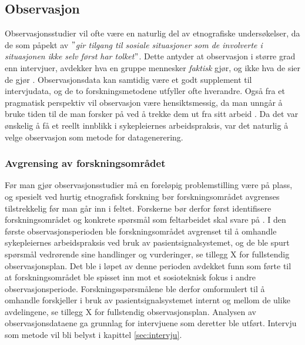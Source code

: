 \subsection{Observasjon}
\label{section:observasjon}
 
Observasjonsstudier vil ofte være en naturlig del av etnografiske undersøkelser, da de som påpekt av \citet{Tjora} \textit{$"$gir tilgang til sosiale situasjoner som de involverte i situasjonen ikke selv først har tolket$"$}. Dette antyder at observasjon i større grad enn intervjuer, avdekker hva en gruppe mennesker \textit{faktisk} gjør, og ikke hva de sier de gjør \citep{Oates, Blomberg93, Tjora}. Observasjonsdata kan samtidig være et godt supplement til intervjudata, og de to forskningsmetodene utfyller ofte hverandre. Også fra et pragmatisk perspektiv vil observasjon være hensiktsmessig, da man unngår å bruke tiden til de man forsker på ved å trekke dem ut fra sitt arbeid \citep{Tjora}. Da det var ønskelig å få et reellt innblikk i sykepleiernes arbeidspraksis, var det naturlig å velge observasjon som metode for datagenerering.
 
\noindent
\subsubsection{Avgrensing av forskningsområdet}
Før man gjør observasjonsstudier må en foreløpig problemstilling være på plass, og spesielt ved hurtig etnografisk forskning bør forskningsområdet avgrenses tilstrekkelig før man går inn i feltet. Forskerne bør derfor først identifisere forskningsområdet og konkrete spørsmål som feltarbeidet skal svare på \citep{Tjora, Millen00}. I den første observasjonsperioden ble forskningsområdet avgrenset til å omhandle sykepleiernes arbeidspraksis ved bruk av pasientsignalsystemet, og de ble spurt spørsmål vedrørende sine handlinger og vurderinger, se tillegg X for fullstendig observasjonsplan. Det ble i løpet av denne perioden avdekket funn som førte til at forskningsområdet ble spisset inn mot et sosioteknisk fokus i andre observasjonsperiode. Forskningsspørsmålene ble derfor omformulert til å omhandle forskjeller i bruk av pasientsignalsystemet internt og mellom de ulike avdelingene, se tillegg X for fullstendig observasjonsplan. Analysen av observasjonsdataene ga grunnlag for intervjuene som deretter ble utført. Intervju som metode vil bli belyst i kapittel \ref{sec:intervju}.

